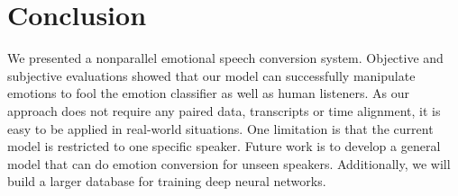\documentclass{article}
\begin{document}
\section{Conclusion}
\label{sec:con}
We presented a nonparallel emotional speech conversion system. Objective and subjective evaluations showed that our model can successfully manipulate emotions to fool the emotion classifier as well as human listeners. As our approach does not require any paired data, transcripts or time alignment, it is easy to be applied in real-world situations. {\color{blue} One limitation is that the current model is restricted to one specific speaker.} Future work is to develop a general model that can do emotion conversion for unseen speakers. Additionally, we will build a larger database for training deep neural networks.





%
%


\end{document}
